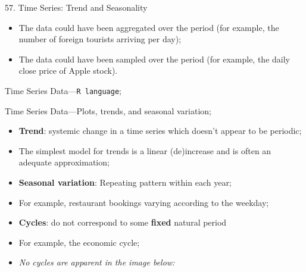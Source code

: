 \begin{CHPT_SUMM_AUTO}[label = {L.-57}]{57. Time Series: Trend and Seasonality}
\begin{description}
\begin{itemize}
\begin{itemize}
			\item	The data could have been aggregated over the period (for example, the number of foreign tourists arriving per day);
			\item	The data could have been sampled over the period (for example, the daily close price of Apple stock).
			\end{itemize}
		\end{itemize}
	\item[1.3:]	Time Series Data---\texttt{R language};
	\item[1.4:]	Time Series Data---Plots, trends, and seasonal variation;
		\begin{itemize}
		\item	\textbf{Trend}: systemic change in a time series which doesn't appear to be periodic;
		\item[]	The simplest model for trends is a linear (de)increase and is often an adequate approximation;
		\item	\textbf{Seasonal variation}: Repeating pattern within each year;
		\item[]	For example, restaurant bookings varying according to the weekday;
		\item	\textbf{Cycles}: do not correspond to some \textbf{fixed} natural period
		\item[]	For example, the economic cycle;
		\item[]	\textit{No cycles are apparent in the image below:}
		

\end{itemize}
\end{description}
\end{CHPT_SUMM_AUTO}
